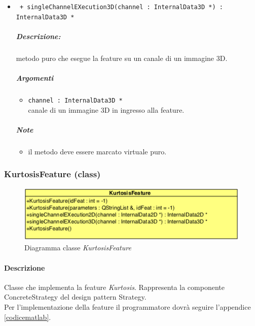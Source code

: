 \begin{itemize}
	\item \color{blue}\verb! + singleChannelEXecution3D(channel : InternalData3D *) : InternalData3D *!
		\color{black}
		\subparagraph{Descrizione:} metodo puro che esegue la feature su un canale di un immagine 3D.
		\subparagraph{Argomenti}
			\begin{itemize}
				\item \color{RoyalPurple} \verb!channel : InternalData3D * ! \\ 
				\color{black} canale di un immagine 3D in ingresso alla feature.		
			\end{itemize}
		\subparagraph{Note}
			\begin{itemize}
				\item il metodo deve essere marcato virtuale puro.
			\end{itemize}
			
	\end{itemize}



\color{black}
\pagebreak
\subsubsection{KurtosisFeature (class)}
\label{KurtosisFeature}
\begin{figure}[!h]
\centering
			\includegraphics[scale=1]{./Content/Immagini/modelCore/KurtosisFeature.png}
			\caption{Diagramma classe \textsl{KurtosisFeature}}
			\label{kurtosisFeature_img}
\end{figure}

\paragraph{Descrizione \\} Classe che implementa la feature\g{} \textit{Kurtosis}. Rappresenta la componente ConcreteStrategy del design pattern\g{} Strategy.
\\Per l'implementazione della feature\g{} il programmatore dovrà seguire l'appendice \ref{codicematlab}.

